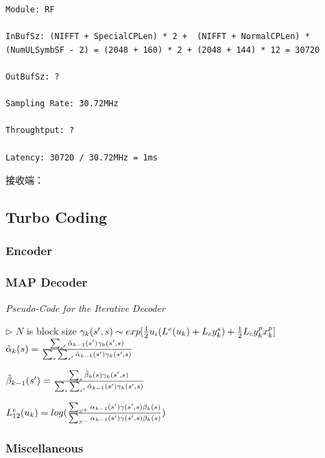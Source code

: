 \documentclass[titlepage]{article}
\numberwithin{figure}{section}
\numberwithin{equation}{section}
\begin{document}
\begin{verbatim}
Module: RF

InBufSz: (NIFFT + SpecialCPLen) * 2 +  (NIFFT + NormalCPLen) * (NumULSymbSF - 2) = (2048 + 160) * 2 + (2048 + 144) * 12 = 30720 

OutBufSz: ?

Sampling Rate: 30.72MHz

Throughtput: ?

Latency: 30720 / 30.72MHz = 1ms
\end{verbatim}

接收端：


\subsection{Turbo Coding}

\subsubsection{Encoder}

\subsubsection{MAP Decoder}

\textit{Pseudo-Code for the Iterative Decoder}

\begin{algorithm}[H]
	\begin{algorithmic}[1]
		 $\triangleright$ $N$ is block size
		\State $\gamma_{k}(s',s) \sim exp[{1\over 2}u_{i}(L^{e}(u_{k})+L_{c}y_{k}^{s})+{1\over 2}L_{c}y_{k}^{p}x_{k}^{p}]$
		\State $\tilde{\alpha}_{k}(s) = {{\sum_{s'}\tilde{\alpha}_{k-1}(s')\gamma_{k}(s',s)}\over {\sum_{s}\sum_{s'} \tilde{\alpha}_{k-1}(s')\gamma_{k}(s',s)}}$
		\EndFor

		\State $\tilde{\beta}_{k-1}(s') = {{\sum_{s}\tilde{\beta}_{k}(s)\gamma_{k}(s',s)}\over {\sum_{s}\sum_{s'} \tilde{\alpha}_{k-1}(s')\gamma_{k}(s',s)}}$
		\EndFor

		\State $L_{12}^{e}(u_{k}) = log({{\sum_{S^{+}} \alpha_{k-1}(s')\gamma(s',s)\beta_{k}(s)}\over {\sum_{S^{-}} \alpha_{k-1}(s')\gamma(s',s)\beta_{k}(s)}})$
		\EndFor
\end{algorithmic}
\end{algorithm}

\subsubsection{Miscellaneous}
\end{document}
